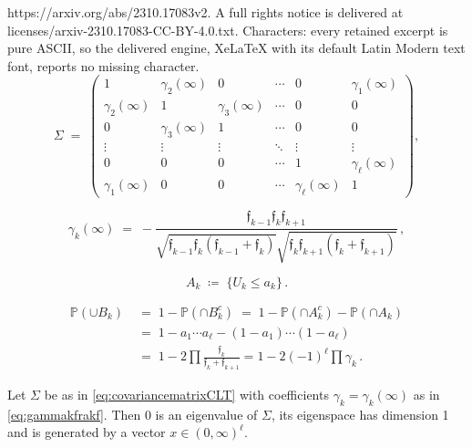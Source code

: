 \documentclass[10pt,a4paper]{amsart}
\newcommand{\bb}[1]{{\mathbb #1}}
\newcommand{\f}{{\mf f}}
\newcommand{\mf}[1]{{\mathfrak #1}}
\begin{document}
https://arxiv.org/abs/2310.17083v2. A full rights notice is delivered at licenses/arxiv-2310.17083-CC-BY-4.0.txt. Characters: every retained excerpt is pure ASCII, so the delivered engine, XeLaTeX with its default Latin Modern text font, reports no missing character.
\begin{equation}\label{eq:covariancematrixCLT}
\Sigma \;=\;\left(
\begin{array}{cccccccc}
1 & \gamma_2(\infty) & 0 & \cdots  & 0 &\gamma_1(\infty)\\
\gamma_2(\infty) & 1 & \gamma_3(\infty) & \cdots & 0 & 0\\
0 & \gamma_3(\infty) & 1 & \cdots& 0 & 0\\
\vdots & \vdots & \vdots & \ddots & \vdots & \vdots\\
0 & 0 & 0 & \cdots & 1 & \gamma_{\ell}(\infty)\\
\gamma_1(\infty) & 0 & 0 & \cdots & \gamma_{\ell}(\infty) & 1
\end{array}\right),
\end{equation}

\begin{equation}\label{eq:gammakfrakf}
\gamma_k(\infty)\;=\;-\frac{\f_{k-1}\f_k\mf f_{k+1}}{\sqrt{\f_{k-1}\mf f_k(\f_{k-1}+\f_{k})}\sqrt{\f_{k}\f_{k+1}(\f_{k}+\f_{k+1})}}\,,
\end{equation}

\begin{equation}
\label{eq:def_event_Ak}
    A_k \;\coloneqq\; \{U_k \le a_k\}\,.
\end{equation}

\begin{align}
\bb P(\cup B_k)
    &\;=\; 1 - \bb P(\cap B^c_k)
    \;=\; 1 - \bb P(\cap A^c_k) -  \bb P(\cap A_k)\nonumber\\
    &\;=\; 1 - a_1 \cdots a_\ell - (1 - a_1) \cdots (1 - a_\ell) \nonumber\\
    &\;=\; 1 - 2 \prod \frac{\f_k}{\f_k + \f_{k+1}}     = 1 - 2 (-1)^\ell \prod \gamma_k\,.\label{eq:prob_cup_Bk_2}
\end{align}

\begin{proposition}
\label{prop:h2_eigenspace_zero}
Let $\Sigma$ be as in \eqref{eq:covariancematrixCLT} with coefficients $\gamma_k=\gamma_k(\infty)$ as in \eqref{eq:gammakfrakf}. Then $0$ is an eigenvalue of $\Sigma$, its eigenspace has dimension 1 and is generated by a vector $x \in (0,\infty)^{\ell}$.
\end{proposition}
\end{document}
